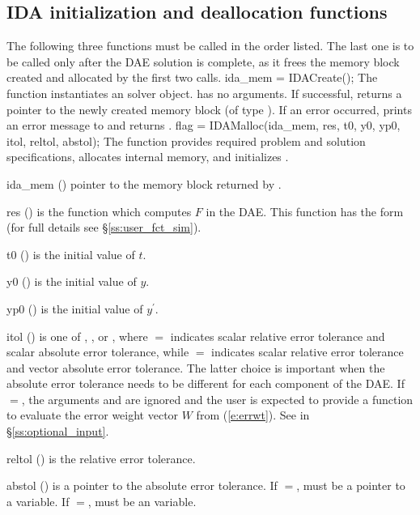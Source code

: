 \subsection{IDA initialization and deallocation functions}
\label{sss:idamalloc}
The following three functions must be called in the order listed. The last one is to
be called only after the DAE solution is complete, as it frees the {\ida} memory
block created and allocated by the first two calls.
{
  ida\_mem = IDACreate();
}
{
  The function  instantiates an {\ida} solver object.
}
{
   has no arguments.
}
{
  If successful,  returns a pointer to the newly created 
  {\ida} memory block (of type ).
  If an error occurred,  prints an error message to 
  and returns .
}
{}
{
flag = IDAMalloc(ida\_mem, res, t0, y0, yp0, itol, reltol, abstol);
}
{
  The function  provides required problem and solution specifications, 
  allocates internal memory, and initializes {\ida}.
}
{
  \begin{args}
  \item[ida\_mem] ()
    pointer to the {\ida} memory block returned by .
  \item[res] ()
    is the {\C} function which computes $F$ in the DAE. This function has the form 
     (for full details see \S\ref{ss:user_fct_sim}).
  \item[t0] ()
    is the initial value of $t$.
  \item[y0] ()
    is the initial value of $y$. 
  \item[yp0] ()
    is the initial value of $y^\prime$. 
  \item[itol] () 
    is one of , , or , where $=$
    indicates scalar relative error 
    tolerance and scalar absolute error tolerance, while $=$
    indicates scalar relative error tolerance and vector absolute error tolerance. 
    The latter choice is important when the absolute error tolerance needs to
    be different for each component of the DAE. 
    If $=$, the arguments  and  are ignored
    and the user is expected to provide a function to evaluate the error weight vector
    $W$ from (\ref{e:errwt}). See  in \S\ref{ss:optional_input}.
  \item[reltol] ()
    is the relative error tolerance.
  \item[abstol] ()
    is a pointer to the absolute error tolerance. If $=$, 
    must be a pointer to a  variable. If $=$, 
    must be an  variable.
  \end{args}
}
